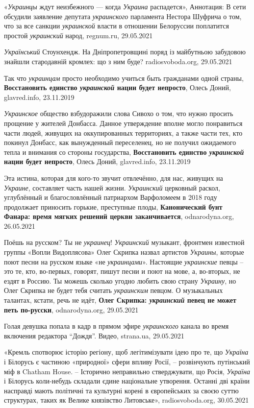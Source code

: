 «\emph{Украинцы} ждут неизбежного — когда \emph{Украина} распадется», Аннотация: В сети
обсудили заявление депутата \emph{украинского} парламента Нестора Шуфрича о том, что
за все санкции \emph{украинской} власти в отношении Белоруссии поплатится простой
\emph{украинский} народ, regnum.ru, 29.05.2021

\emph{Український} Стоунхендж. На Дніпропетровщині поряд із майбутньою забудовою
знайшли стародавній кромлех: що з ним буде? radiosvoboda.org, 29.05.2021

Так что \emph{украинцам} просто необходимо учиться быть гражданами одной
страны, \textbf{Восстановить единство \emph{украинской} нации будет непросто},
Олесь Доний, glavred.info, 23.11.2019

\emph{Украинское} общество взбудоражили слова Сивохо о том, что нужно просить
прощение у жителей Донбасса. Данное утверждение вполне могло понравиться части
людей, живущих на оккупированных территориях, а также части тех, кто покинул
Донбасс, как вынужденный переселенец, но не получил ожидаемого тепла и внимания
со стороны государства, \textbf{Восстановить единство \emph{украинской} нации
будет непросто}, Олесь Доний, glavred.info, 23.11.2019

Эта истина, которая для кого-то звучит отвлечённо, для нас, живущих на
\emph{Украине}, составляет часть нашей жизни. \emph{Украинский} церковный
раскол, углублённый и благословлённый патриархом Варфоломеем в 2018 году
продолжает приносить горькие, преступные плоды, \textbf{Канонический бунт
Фанара: время мягких решений церкви заканчивается}, odnarodyna.org, 26.05.2021

Поёшь на русском? Ты не \emph{украинец}! \emph{Украинский} музыкант, фронтмен
известной группы «Вопли Видоплясова» Олег Скрипка назвал артистов
\emph{Украины}, которые поют песни на русском языке «не \emph{украинцами}».
Настоящие \emph{украинские} певцы – это те, кто, во-первых, говорят, пишут
песни и поют на мове, а, во-вторых, не ездят в Россию. Ты можешь сколько угодно
любить свою страну \emph{Украину}, но Олег Скрипка не будет тебя считать
\emph{украинским} певцом. О музыкальных талантах, кстати, речь не идёт,
\textbf{Олег Скрипка: \emph{украинский} певец не может петь по-русски},
odnarodyna.org, 29.05.2021

Голая девушка попала в кадр в прямом эфире \emph{украинского} канала во время
включения редактора \enquote{Дождя}. Видео, strana.ua, 29.05.2021

«Кремль спотворює історію регіону, щоб легітимізувати ідею про те, що
\emph{Україна} і Білорусь є частиною «природної» сфери впливу Росії, –
розвінчують путінський міф в Chatham House. – Історично неправильно
стверджувати, що Росія, \emph{Україна} і Білорусь коли-небудь складали єдине
національне утворення. Останні дві країни насправді мають політичні та
культурні корені в європейських за своєю суттю структурах, таких як Велике
князівство Литовське», radiosvoboda.org, 30.05.2021

